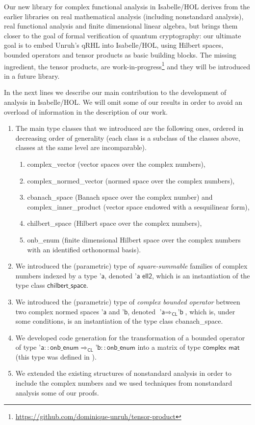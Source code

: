 \documentclass[12pt]{article}
\theoremstyle{definition}
\begin{document}
Our new library for complex functional analysis in Isabelle/HOL derives from the
earlier libraries on real mathematical analysis (including nonstandard analysis), real functional analysis and finite dimensional linear algebra, but brings them closer to the goal of formal verification of quantum cryptography: our ultimate goal is to embed Unruh's qRHL into Isabelle/HOL, using Hilbert spaces, bounded operators and tensor products as basic building blocks. The missing ingredient, the tensor products, are work-in-progress\footnote{\url{https://github.com/dominique-unruh/tensor-product}} and they will be introduced in a future library.

In the next lines we describe our main contribution to the development of analysis in Isabelle/HOL. We will omit some of our results in order to avoid an overload of information in the description of our work.

\begin{enumerate}[label*=\Alph*.]
\item The main type classes that we introduced are the following ones, ordered in decreasing order of generality (each class is a subclass of the classes above, classes at the same level are incomparable).
\begin{enumerate}[label*=\arabic*.]
\item \textsf{complex\_vector} (vector spaces over the complex numbers),
\item \textsf{complex\_normed\_vector} (normed space over the complex numbers), 
\item \textsf{cbanach\_space} (Banach space over the complex number) and \textsf{complex\_inner\_product} (vector space endowed with a sesquilinear form),
\item \textsf{chilbert\_space} (Hilbert space over the complex numbers),
\item \textsf{onb\_enum} (finite dimensional Hilbert space over the complex numbers with an identified orthonormal basis).
\end{enumerate}
\item We introduced the (parametric) type of \emph{square-summable} families of complex numbers indexed by a type $\textsf{'a}$, denoted $\textsf{'a ell2}$, which is an instantiation of the type class $\textsf{chilbert\_space}$.
\item We introduced the (parametric) type of \emph{complex bounded operator} between two complex normed spaces $\textsf{'a}$ and  $\textsf{'b}$, denoted $\textsf{'a} \Rightarrow_{\textsf{CL}} \textsf{'b}$, which is, under some conditions, is an instantiation of the type class \textsf{cbanach\_space}.
\item We developed code generation for the transformation of a bounded operator of type $\textsf{'a}::\textsf{onb\_enum} \Rightarrow_{\textsf{CL}} \textsf{'b}::\textsf{onb\_enum}$ into a matrix of type $\textsf{complex mat}$ (this type was defined in \cite{Jordan_Normal_Form-AFP}).
\item We extended the existing structures of nonstandard analysis in order to include the complex numbers and we used techniques from nonstandard analysis some of our proofs.
\end{enumerate}
\end{document}
